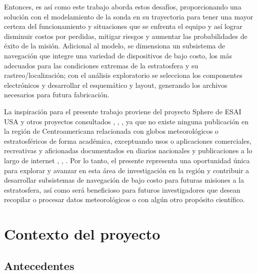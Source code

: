 Entonces, es así como este trabajo aborda estos desafíos, proporcionando una solución con el modelamiento de la sonda en su trayectoria para tener una mayor certeza del funcionamiento y situaciones que se enfrenta el equipo y así lograr disminuir costos por perdidas, mitigar riesgos y aumentar las probabilidades de éxito de la misión. Adicional al modelo, se dimensiona un subsistema de navegación que integre una variedad de dispositivos de bajo costo, los más adecuados para las condiciones extremas de la estratosfera y su rastreo/localización;  con el análisis exploratorio se  selecciona los componentes electrónicos y desarrollar el esquemático y layout, generando los archivos necesarios para futura fabricación.

La inspiración para el presente trabajo proviene del proyecto Sphere de ESAI USA y otros proyectos consultados \cite{ sphere_ESAI}, \cite{Irazu_CR}, \cite{pycubed}, ya que no existe ninguna publicación en la región de Centroamericana relacionada con globos meteorológicos o estratosféricos de forma académica, exceptuando usos o aplicaciones comerciales, recreativas y aficionadas documentados en diarios nacionales y publicaciones a lo largo de internet \cite{globo_pupuseriasuiza_1},  \cite{globo_nayib_nuevocuscatlan}, \cite{globo_pupuseriasuiza_2}. Por lo tanto, el presente representa una oportunidad única para explorar y avanzar en esta área de investigación en la región y contribuir a desarrollar subsistemas de navegación de bajo costo para futuras misiones a la estratosfera, así como será beneficioso para futuros investigadores que desean recopilar o procesar datos meteorológicos o con algún otro propósito científico.

\newpage

\section{Contexto del proyecto} \label{sct:intro:contexto}

\subsection{Antecedentes}

